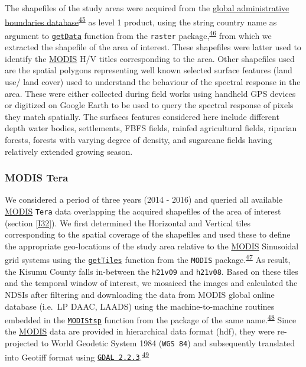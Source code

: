\documentclass[12pt,oneside]{article}
\begin{document}
The shapefiles of the study areas were acquired from the \href{https://gadm.org/}{global administrative boundaries database}\textsuperscript{\protect\hyperlink{ref-GADM_2018}{45}} as level 1 product, using the string country name as argument to \href{https://www.rdocumentation.org/packages/raster/versions/2.8-19/topics/getData}{\texttt{getData}} function from the \texttt{raster} package,\textsuperscript{\protect\hyperlink{ref-Hijmans_2019}{46}} from which we extracted the shapefile of the area of interest. These shapefiles were latter used to identify the \href{https://terra.nasa.gov/about/terra-instruments/modis}{MODIS} H/V titles corresponding to the area. Other shapefiles used are the spatial polygons representing well known selected surface features (land use/ land cover) used to understand the behaviour of the spectral response in the area. These were either collected during field works using handheld GPS devices or digitized on Google Earth to be used to query the spectral response of pixels they match spatially. The surfaces features considered here include different depth water bodies, settlements, FBFS fields, rainfed agricultural fields, riparian forests, forests with varying degree of density, and sugarcane fields having relatively extended growing season.

\hypertarget{I33}{%
\subsubsection{MODIS Tera}\label{I33}}

We considered a period of three years (2014 - 2016) and queried all available \href{https://terra.nasa.gov/about/terra-instruments/modis}{MODIS} \texttt{Tera} data overlapping the acquired shapefiles of the area of interest (section \ref{I32}). We first determined the Horizontal and Vertical tiles corresponding to the spatial coverage of the shapefiles and used these to define the appropriate geo-locations of the study area relative to the \href{https://terra.nasa.gov/about/terra-instruments/modis}{MODIS} Sinusoidal grid systems using the \href{https://www.rdocumentation.org/packages/MODIS/versions/1.1.4/topics/getTile}{\texttt{getTiles}} function from the \texttt{MODIS} package.\textsuperscript{\protect\hyperlink{ref-Mattiuzzi_and_Detsch_2018}{47}} As result, the Kisumu County falls in-between the \texttt{h21v09} and \texttt{h21v08}. Based on these tiles and the temporal window of interest, we mosaiced the images and calculated the NDSIs after filtering and downloading the data from MODIS global online database (i.e.~LP DAAC, LAADS) using the machine-to-machine routines embedded in the \href{https://www.rdocumentation.org/packages/MODIStsp/versions/1.3.2}{\texttt{MODIStsp}} function from the package of the same name.\textsuperscript{\protect\hyperlink{ref-Busetto_and_ranghetti_2016}{48}} Since the \href{https://terra.nasa.gov/about/terra-instruments/modis}{MODIS} data are provided in hierarchical data format (hdf), they were re-projected to World Geodetic System 1984 (\texttt{WGS\ 84}) and subsequently translated into Geotiff format using \href{https://www.gdal.org/}{\texttt{GDAL\ 2.2.3}}.\textsuperscript{\protect\hyperlink{ref-GDAL_OGRcontributors_2018}{49}}
\end{document}
